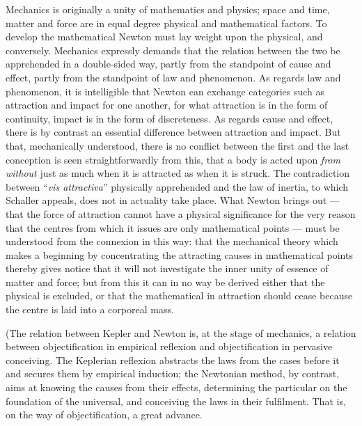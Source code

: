 \documentclass[12pt,a4paper]{book}
\begin{document}
Mechanics is originally a unity of mathematics and physics; space and time, matter and force are in equal
degree physical and mathematical factors. To develop the mathematical Newton must lay weight upon the
physical, and conversely. Mechanics expressly demands that the relation between the two be apprehended in a
double-sided way, partly from the standpoint of cause and effect, partly from the standpoint of law and
phenomenon. As regards law and phenomenon, it is intelligible that Newton can exchange categories such as
attraction and impact for one another, for what attraction is in the form of continuity, impact is in the
form of discreteness. As regards cause and effect, there is by contrast an essential difference between
attraction and impact. But that, mechanically understood, there is no conflict between the first and the
last conception is seen straightforwardly from this, that a body is acted upon \emph{from without} just as
much when it is attracted as when it is struck.
The contradiction between ``\textit{vis attractiva}'' physically apprehended
and the law of inertia, to which Schaller appeals, does not in actuality take place. What Newton brings
out --- that the force of attraction cannot have a physical significance for the very reason that the centres
from which it issues are only mathematical points --- must be understood from the connexion in this way: that
the mechanical theory which makes a beginning by concentrating the attracting causes in mathematical points
thereby gives notice that it will not investigate the inner unity of essence of matter and force; but from
this it can in no way be derived either that the physical is excluded, or that the mathematical in attraction
should cease because the centre is laid into a corporeal mass.

(The relation between Kepler and Newton is, at the stage of mechanics, a
relation between objectification in empirical reflexion and objectification in pervasive conceiving. The
Keplerian reflexion abstracts the laws from the cases before it and secures them by empirical induction; the
Newtonian method, by contrast, aims at knowing the causes from their effects, determining the particular on
the foundation of the universal, and conceiving the laws in their fulfilment. That is, on the way of
objectification, a great advance.
\end{document}
